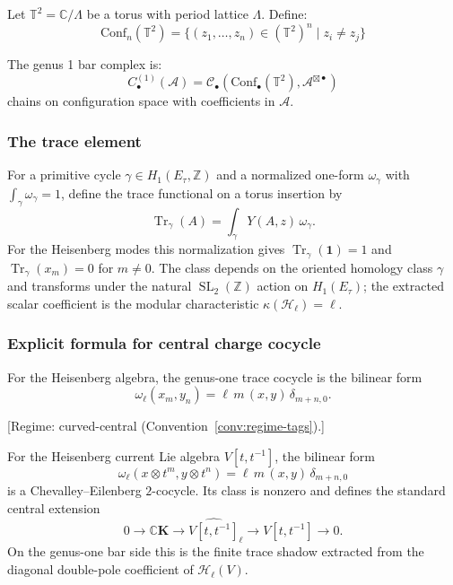 Let $\mathbb{T}^2 = \mathbb{C}/\Lambda$ be a torus with period lattice $\Lambda$.
Define:
\[\mathrm{Conf}_n(\mathbb{T}^2) = \{ (z_1, \ldots, z_n) \in (\mathbb{T}^2)^n \mid z_i \neq z_j \}\]

The genus 1 bar complex is:
\[C_{\bullet}^{(1)}(\mathcal{A}) = \mathcal{C}_{\bullet}(\mathrm{Conf}_{\bullet}(\mathbb{T}^2),
\mathcal{A}^{\boxtimes \bullet})\]
chains on configuration space with coefficients in $\mathcal{A}$.

\subsubsection{The trace element}

For a primitive cycle $\gamma\in H_1(E_\tau,\mathbb Z)$ and a normalized
one-form $\omega_\gamma$ with $\int_\gamma\omega_\gamma=1$, define the
trace functional on a torus insertion by
\[
\operatorname{Tr}_\gamma(A)=\int_\gamma Y(A,z)\,\omega_\gamma .
\]
For the Heisenberg modes this normalization gives
$\operatorname{Tr}_\gamma(\mathbf 1)=1$ and
$\operatorname{Tr}_\gamma(x_m)=0$ for $m\neq 0$. The class depends on the
oriented homology class $\gamma$ and transforms under the natural
$\operatorname{SL}_2(\mathbb Z)$ action on $H_1(E_\tau)$; the extracted
scalar coefficient is the modular characteristic
$\kappa(\mathcal H_\ell)=\ell$.

\subsubsection{Explicit formula for central charge cocycle}

For the Heisenberg algebra, the genus-one trace cocycle is the bilinear
form
\[
\omega_\ell(x_m,y_n)
  =\ell\,m\,(x,y)\,\delta_{m+n,0}.
\]

\begin{theorem}\label{thm:central-charge-cocycle}
\textup{[Regime: curved-central
\textup{(}Convention~\textup{\ref{conv:regime-tags})}.]}

For the Heisenberg current Lie algebra
$V[t,t^{-1}]$, the bilinear form
\[
\omega_\ell(x\otimes t^m,y\otimes t^n)
  =\ell\,m\,(x,y)\,\delta_{m+n,0}
\]
is a Chevalley--Eilenberg $2$-cocycle. Its class is nonzero and defines
the standard central extension
\[
0\to \mathbb C\mathbf K\to
\widehat{V[t,t^{-1}]}_\ell\to V[t,t^{-1}]\to 0.
\]
On the genus-one bar side this is the finite trace shadow extracted
from the diagonal double-pole coefficient of
$\mathcal H_\ell(V)$.
\end{theorem}

